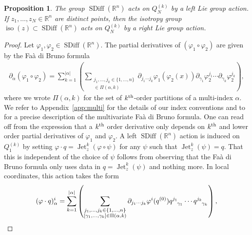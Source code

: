 \documentclass[12pt]{amsart}
\newcommand{\R}{\ensuremath{\mathbb{R}}}
\newtheorem{prop}[thm]{Proposition}
\DeclareMathOperator{\SDiff}{SDiff}
\DeclareMathOperator{\Jet}{Jet}
\DeclareMathOperator{\iso}{iso}
\begin{document}
  \begin{prop}
    The group $\SDiff(\R^n)$ acts on $Q_N^{(k)}$ by a left Lie group
    action.  If $z_1,\dots,z_N \in \R^n$ are distinct points,
    then the isotropy group $\iso(z) \subset \SDiff(\R^n)$
    acts on $Q_N^{(k)}$ by a right Lie group action. \label{HL_action_prop}
  \end{prop}
  \begin{proof}
    Let $\varphi_1,\varphi_2 \in \SDiff(\R^n)$.
    The partial derivatives of $(\varphi_1 \circ \varphi_2)$
    are given by the Fa\`a di Bruno formula
    \begin{align*}
      \partial_\alpha( \varphi_1 \circ \varphi_2) = \sum_{k=1}^{|\alpha|}
      \left(
        \sum_{
        \substack{
          j_1,\dots,j_k \in \{1,\dots,n\} \\
          [\gamma_1,\dots,\gamma_k] \in \Pi(\alpha , k)
          }
          }
          \partial_{j_1 \cdots j_k} \varphi_1(\varphi_2(x))
          \partial_{\gamma_1} \varphi_2^{j_1} \cdots
          \partial_{\gamma_k} \varphi_2^{j_k}
        \right),
    \end{align*}
where we wrote $\Pi(\alpha, k)$ for the set of $k^{\rm th}$-order partitions of a multi-index $\alpha$. We refer to Appendix~\ref{app:multi} for the details of our index conventions and to \cite{ConstantineSavits1996,Jacobs2014b} for a
    precise description of the multivariate Fa\`a di Bruno formula.
    One can read off   from the expression that
    a $k^{\rm th}$ order derivative only depends on $k^{\rm th}$
    and lower order
    partial derivatives of $\varphi_1$ and $\varphi_2$.
        A left $\SDiff(\R^n)$ action is induced on $Q_1^{(k)}$ by
    setting $\varphi \cdot q = \Jet^k_z( \varphi \circ \psi)$
    for any $\psi$ such that $\Jet^k_z(\psi) = q$.
    That this is independent of the choice of $\psi$ follows
    from observing that the Fa\`a di Bruno formula
    only uses data in $q = \Jet^k_z(\psi)$ and nothing more.
    In local coordinates, this action takes the form
    \begin{align*}
    (\varphi \cdot q)^i_\alpha =
     \sum_{k=1}^{|\alpha|}
      \left(
        \sum_{
        \substack{
          j_1,\dots,j_k \in \{1,\dots,n\} \\
          [\gamma_1,\dots,\gamma_k] \in \Pi(\alpha , k)
          }
          }
          \partial_{j_1 \cdots j_k} \varphi^i(q^{(0)})
          q\indices{^{j_1}_{\gamma_1}} \cdots
          q\indices{^{j_k}_{\gamma_k}}
        \right),
    \end{align*}

\end{proof}
\end{document}
